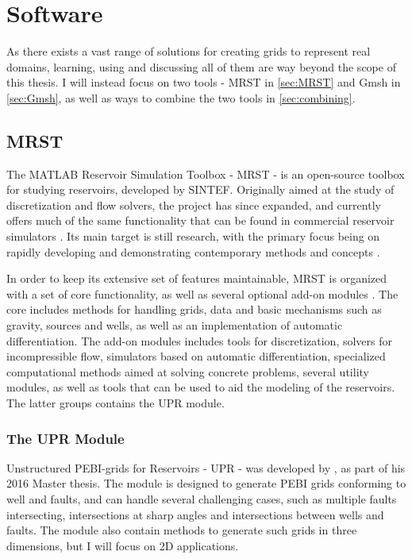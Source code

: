 \section{Software}
As there exists a vast range of solutions for creating grids to represent real domains, learning, using and discussing all of them are way beyond the scope of this thesis. I will instead focus on two tools - MRST in \autoref{sec:MRST} and Gmsh in \autoref{sec:Gmsh}, as well as ways to combine the two tools in \autoref{sec:combining}. 

\subsection{MRST}
\label{sec:MRST}
The MATLAB Reservoir Simulation Toolbox - MRST - is an open-source toolbox for studying reservoirs, developed by SINTEF. Originally aimed at the study of discretization and flow solvers, the project has since expanded, and currently offers much of the same functionality that can be found in commercial reservoir simulators \cite{MRST_book}. Its main target is still research, with the primary focus being on rapidly developing and demonstrating contemporary methods and concepts \cite{MRST_website}.

In order to keep its extensive set of features maintainable, MRST is organized with a set of core functionality, as well as several optional add-on modules \cite{MRST_book}. The core includes methods for handling grids, data and basic mechanisms such as gravity, sources and wells, as well as an implementation of automatic differentiation. The add-on modules includes tools for discretization, solvers for incompressible flow, simulators based on automatic differentiation, specialized computational methods aimed at solving concrete problems, several utility modules, as well as tools that can be used to aid the modeling of the reservoirs. The latter groups contains the UPR module.


\subsubsection{The UPR Module}
\label{sec:UPR}
Unstructured PEBI-grids for Reservoirs - UPR - was developed by \textcite{UPR_thesis}, as part of his 2016 Master thesis. The module is designed to generate PEBI grids conforming to well and faults, and can handle several challenging cases, such as multiple faults intersecting, intersections at sharp angles and intersections between wells and faults. The module also contain methods to generate such grids in three dimensions, but I will focus on 2D applications.

